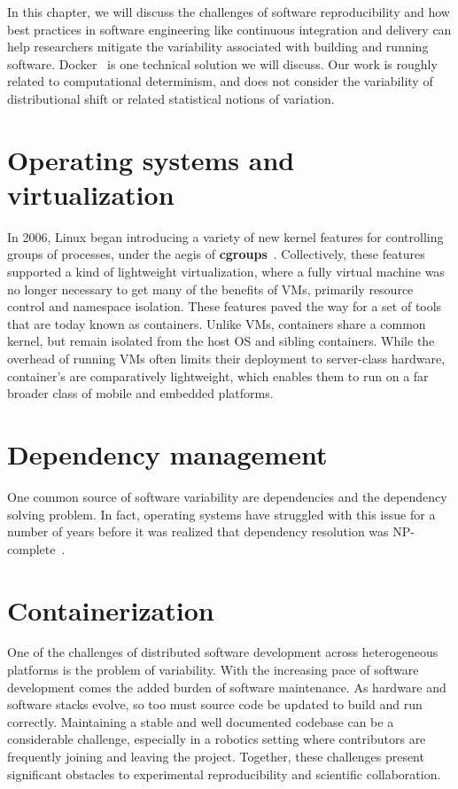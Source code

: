 \documentclass[12pt,initial,twoside,maitrise]{dms}
\numberwithin{equation}{section}
\numberwithin{table}{chapter}
\numberwithin{figure}{chapter}
\begin{document}
In this chapter, we will discuss the challenges of software reproducibility and how best practices in software engineering like continuous integration and delivery can help researchers mitigate the variability associated with building and running software. Docker~\cite{merkel2014docker} is one technical solution we will discuss. Our work is roughly related to computational determinism, and does not consider the variability of distributional shift or related statistical notions of variation.

\section{Operating systems and virtualization}\label{sec:os-and-virtualization}

In 2006, Linux began introducing a variety of new kernel features for controlling groups of processes, under the aegis of \textbf{cgroups}~\cite{menage2007adding}. Collectively, these features supported a kind of lightweight virtualization, where a fully virtual machine was no longer necessary to get many of the benefits of VMs, primarily resource control and namespace isolation. These features paved the way for a set of tools that are today known as containers. Unlike VMs, containers share a common kernel, but remain isolated from the host OS and sibling containers. While the overhead of running VMs often limits their deployment to server-class hardware, container's are comparatively lightweight, which enables them to run on a far broader class of mobile and embedded platforms.

\section{Dependency management}\label{sec:dependency-management}

One common source of software variability are dependencies and the dependency solving problem. In fact, operating systems have struggled with this issue for a number of years before it was realized that dependency resolution was NP-complete~\cite{abate2012dependency}.

\section{Containerization}\label{sec:containerization}

One of the challenges of distributed software development across heterogeneous platforms is the problem of variability. With the increasing pace of software development comes the added burden of software maintenance. As hardware and software stacks evolve, so too must source code be updated to build and run correctly. Maintaining a stable and well documented codebase can be a considerable challenge, especially in a robotics setting where contributors are frequently joining and leaving the project. Together, these challenges present significant obstacles to experimental reproducibility and scientific collaboration.
\end{document}
